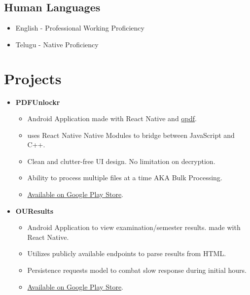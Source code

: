 \documentclass{article}
\begin{document}
\subsection{Human Languages}
\begin{itemize}
    \item English - Professional Working Proficiency
    \item Telugu - Native Proficiency
\end{itemize}

\section{Projects}

\begin{itemize}
    \item \textbf{PDFUnlockr}
    \subitem
    \begin{itemize}
        \vspace{-0.25cm}
        \item Android Application made with React Native and \href{http://qpdf.sourceforge.net/}{qpdf}.
        \item uses React Native Native Modules to bridge between JavaScript and C++.
        \item Clean and clutter-free UI design. No limitation on decryption.
        \item Ability to process multiple files at a time AKA Bulk Processing.
        \item \href{https://play.google.com/store/apps/details?id=com.pdfunlockr}{Available on Google Play Store}.
        \vspace{0.35cm}
    \end{itemize}
    
    \item \textbf{OUResults}
    \subitem
    \begin{itemize}
        \vspace{-0.25cm}
        \item Android Application to view examination/semester results. made with React Native.
        \item Utilizes publicly available endpoints to parse results from HTML.
        \item Persistence requests model to combat slow response during initial hours.
        \item \href{https://play.google.com/store/apps/details?id=com.ouresults}{Available on Google Play Store}.
        \vspace{0.35cm}
    \end{itemize}


\end{itemize}
\end{document}
